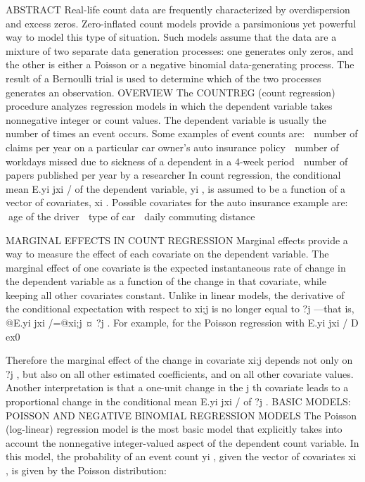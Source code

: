 
ABSTRACT
Real-life count data are frequently characterized by overdispersion and excess zeros. Zero-inflated count models
provide a parsimonious yet powerful way to model this type of situation. Such models assume that the data are a
mixture of two separate data generation processes: one generates only zeros, and the other is either a Poisson or
a negative binomial data-generating process. The result of a Bernoulli trial is used to determine which of the two
processes generates an observation.
OVERVIEW
The COUNTREG (count regression) procedure analyzes regression models in which the dependent variable takes
nonnegative integer or count values. The dependent variable is usually the number of times an event occurs. Some
examples of event counts are:
 number of claims per year on a particular car owner’s auto insurance policy
 number of workdays missed due to sickness of a dependent in a 4-week period
 number of papers published per year by a researcher
In count regression, the conditional mean E.yi jxi / of the dependent variable, yi , is assumed to be a function of a vector
of covariates, xi . Possible covariates for the auto insurance example are:
 age of the driver
 type of car
 daily commuting distance

MARGINAL EFFECTS IN COUNT REGRESSION
Marginal effects provide a way to measure the effect of each covariate on the dependent variable. The marginal effect
of one covariate is the expected instantaneous rate of change in the dependent variable as a function of the change
in that covariate, while keeping all other covariates constant. Unlike in linear models, the derivative of the conditional
expectation with respect to xi;j is no longer equal to ?j —that is, @E.yi jxi /=@xi;j ¤ ?j . For example, for the Poisson
regression with E.yi jxi / D ex0

Therefore the marginal effect of the change in covariate xi;j depends not only on ?j , but also on all other estimated
coefficients, and on all other covariate values. Another interpretation is that a one-unit change in the j th covariate leads
to a proportional change in the conditional mean E.yi jxi / of ?j .
BASIC MODELS: POISSON AND NEGATIVE BINOMIAL REGRESSION MODELS
The Poisson (log-linear) regression model is the most basic model that explicitly takes into account the nonnegative
integer-valued aspect of the dependent count variable. In this model, the probability of an event count yi , given the
vector of covariates xi , is given by the Poisson distribution:
